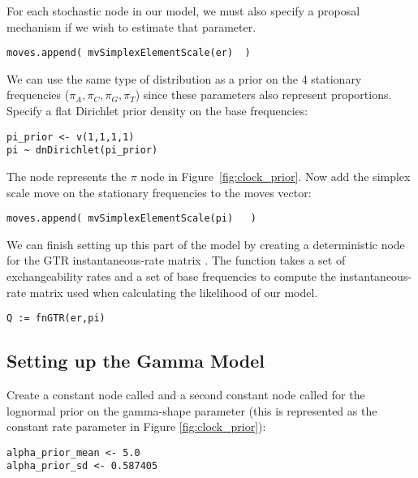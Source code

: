 For each stochastic node in our model, we must also specify a proposal mechanism if we wish to estimate that parameter. 
{\tt\small \begin{snugshade*}
\begin{lstlisting}
moves.append( mvSimplexElementScale(er)  )
\end{lstlisting}
\end{snugshade*}}

We can use the same type of distribution as a prior on the 4 stationary frequencies ($\pi_A, \pi_C, \pi_G, \pi_T$) since these parameters also represent proportions. 
Specify a flat Dirichlet prior density on the base frequencies:
{\tt \begin{snugshade*}
\begin{lstlisting}
pi_prior <- v(1,1,1,1) 
pi ~ dnDirichlet(pi_prior)
\end{lstlisting}
\end{snugshade*}}

The node  represents the $\pi$ node in Figure~\ref{fig:clock_prior}.
Now add the simplex scale move on the stationary frequencies to the moves vector:
{\tt \small \begin{snugshade*}
\begin{lstlisting}
moves.append( mvSimplexElementScale(pi)   )
\end{lstlisting}
\end{snugshade*}}

We can finish setting up this part of the model by creating a deterministic node for the GTR instantaneous-rate matrix . 
The  function takes a set of exchangeability rates and a set of base frequencies to compute the instantaneous-rate matrix used when calculating the likelihood of our model.
{\tt \begin{snugshade*}
\begin{lstlisting}
Q := fnGTR(er,pi)
\end{lstlisting}
\end{snugshade*}}


\subsection{Setting up the Gamma Model}

Create a constant node called  and a second constant node called  for the lognormal prior on the gamma-shape parameter (this is represented as the constant rate parameter in Figure \ref{fig:clock_prior}):
{\tt\begin{snugshade*}
\begin{lstlisting}
alpha_prior_mean <- 5.0
alpha_prior_sd <- 0.587405
\end{lstlisting}
\end{snugshade*}}

